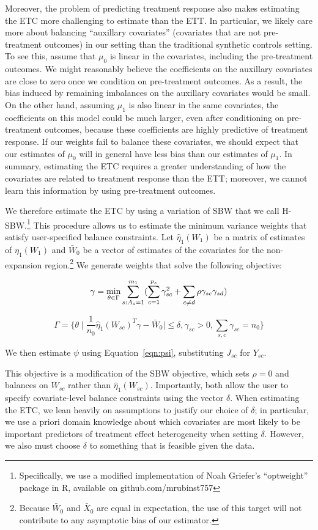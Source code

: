 \documentclass[aoas]{imsart}
\theoremstyle{plain}
\theoremstyle{remark}
\begin{document}
Moreover, the problem of predicting treatment response also makes estimating the ETC more challenging to estimate than the ETT. In particular, we likely care more about balancing ``auxillary covariates'' (covariates that are not pre-treatment outcomes) in our setting than the traditional synthetic controls setting. To see this, assume that $\mu_0$ is linear in the covariates, including the pre-treatment outcomes. We might reasonably believe the coefficients on the auxillary covariates are close to zero once we condition on pre-treatment outcomes. As a result, the bias induced by remaining imbalances on the auxillary covariates would be small. On the other hand, assuming $\mu_1$ is also linear in the same covariates, the coefficients on this model could be much larger, even after conditioning on pre-treatment outcomes, because these coefficients are highly predictive of treatment response. If our weights fail to balance these covariates, we should expect that our estimates of $\mu_0$ will in general have less bias than our estimates of $\mu_1$. In summary, estimating the ETC requires a greater understanding of how the covariates are related to treatment response than the ETT; moreover, we cannot learn this information by using pre-treatment outcomes.

We therefore estimate the ETC by using a variation of SBW that we call H-SBW.\footnote{Specifically, we use a modified implementation of Noah Griefer's ``optweight'' package in R, available on github.com/mrubinst757} This procedure allows us to estimate the minimum variance weights that satisfy user-specified balance constraints. Let $\hat{\eta}_1(W_1)$ be a matrix of estimates of $\eta_1(W_1)$ and $\bar{W}_0$ be a vector of estimates of the covariates for the non-expansion region.\footnote{Because $\bar{W}_0$ and $\bar{X}_0$ are equal in expectation, the use of this target will not contribute to any asymptotic bias of our estimator.} We generate weights that solve the following objective:

$$
\gamma = \min_{\theta \in \Gamma} \sum_{s: A_s = 1}^{m_1}(\sum_{c = 1}^{p_s} \gamma_{sc}^2 + \sum_{c \ne d}\rho \gamma_{sc}\gamma_{sd})\\
$$

$$
\Gamma = \{\theta \mid \frac{1}{n_0}\hat{\eta}_1(W_{sc})^T\gamma - \bar{W}_0 \mid \le \delta, \gamma_{sc} > 0, \sum_{s,c}\gamma_{sc} = n_0\}
$$

We then estimate $\psi$ using Equation~\ref{eqn:psi}, substituting $J_{sc}$ for $Y_{sc}$.

This objective is a modification of the SBW objective, which sets $\rho = 0$ and balances on $W_{sc}$ rather than $\hat{\eta}_1(W_{sc})$. Importantly, both allow the user to specify covariate-level balance constraints using the vector $\delta$. When estimating the ETC, we lean heavily on assumptions to justify our choice of $\delta$; in particular, we use a priori domain knowledge about which covariates are most likely to be important predictors of treatment effect heterogeneity when setting $\delta$. However, we also must choose $\delta$ to something that is feasible given the data. 
\end{document}
